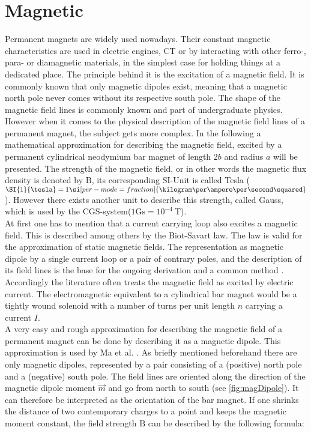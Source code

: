 \section{Magnetic} \label{sec:magneticFound}
Permanent magnets are widely used nowadays. Their constant magnetic characteristics are used in electric engines, \ac{CT} or by interacting with other ferro-, para- or diamagnetic materials, in the simplest case for holding things at a dedicated place. The principle behind it is the excitation of a magnetic field. It is commonly known that only magnetic dipoles exist, meaning that a magnetic north pole never comes without its respective south pole. The shape of the magnetic field lines is commonly known and part of undergraduate physics. However when it comes to the physical description of the magnetic field lines of a permanent magnet, the subject gets more complex. In the following a mathematical approximation for describing the magnetic field, excited by a permanent cylindrical neodymium bar magnet of length $ 2b $ and radius $ a $ will be presented. The strength of the magnetic field, or in other words the magnetic flux density is denoted by $ \mathrm{B} $, its corresponding SI-Unit is called Tesla ($ \SI{1}{\tesla} = 1 \si[per-mode=fraction]{\kilogram \per \ampere \per \second \squared} $). However there exists another unit to describe this strength, called Gauss, which is used by the CGS-system($ 1 \mathrm{Gs} = 10^{-4}\SI{}{\tesla} $). \\
At first one has to mention that a current carrying loop also excites a magnetic field. This is described among others by the Biot-Savart law. The law is valid for the approximation of static magnetic fields. The representation as magnetic dipole by a single current loop or a pair of contrary poles, and the description of its field lines is the base for the ongoing derivation and a common method \cite{derby2010cylindrical}. Accordingly the literature often treats the magnetic field as excited by electric current. The electromagnetic equivalent to a cylindrical bar magnet would be a tightly wound solenoid with a number of turns per unit length $ n $ carrying a current $ I $.\\
A very easy and rough approximation for describing the magnetic field of a permanent magnet can be done by describing it as a magnetic dipole. This approximation is used by Ma et al. \cite{ma2010magnetic}. As briefly mentioned beforehand there are only magnetic dipoles, represented by a pair consisting of a (positive) north pole and a (negative) south pole. The field lines are oriented along the direction of the magnetic dipole moment $ \vec{m} $ and go from north to south (see \ref{fig:magDipole}). It can therefore be interpreted as the orientation of the bar magnet. If one shrinks the distance of two contemporary charges to a point and keeps the magnetic moment constant, the field strength $ \mathrm{B} $ can be described by the following formula:

